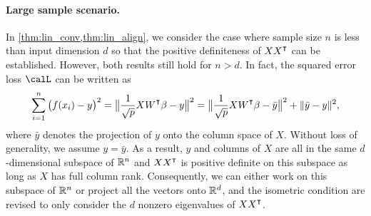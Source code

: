 \paragraph{Large sample scenario.} In \cref{thm:lin_conv,thm:lin_align}, we consider the case where sample size $n$ is less than input dimension $d$ so that the positive definiteness of $XX\transpose$ can be established. However, both results still hold for $n>d$. In fact, the squared error loss $\calL$ can be written as
\begin{equation*}
\sum_{i=1}^n\big(f(x_i)-y\big)^2 = \big\|\frac{1}{\sqrt{p}}XW\transpose\beta-y\big\|^2 = \big\|\frac{1}{\sqrt{p}}XW\transpose\beta-\bar{y}\big\|^2+ \|\bar{y}-y\|^2,
\end{equation*}
where $\bar{y}$ denotes the projection of $y$ onto the column space of $X$. Without loss of generality, we assume $y=\bar{y}$. As a result, $y$ and columns of $X$ are all in the same $d$-dimensional subspace of ${\mathbb{R}^n}$ and $XX\transpose$ is positive definite on this subspace as long as $X$ has full column rank. Consequently, we can either work on this subspace of ${\mathbb{R}^n}$ or project all the vectors onto ${\mathbb{R}^{d}}$, and the isometric condition are revised to only consider the $d$ nonzero eigenvalues of $XX\transpose$.



